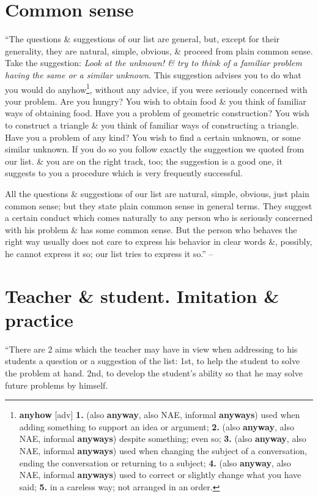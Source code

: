 \documentclass[oneside]{book}
\numberwithin{equation}{section}
\begin{document}
\section{Common sense}
``The questions \& suggestions of our list are general, but, except for their generality, they are natural, simple, obvious, \& proceed from plain common sense. Take the suggestion: \textit{Look at the unknown! \& try to think of a familiar problem having the same or a similar unknown}. This suggestion advises you to do what you would do anyhow\footnote{\textbf{anyhow} [adv] \textbf{1.} (also \textbf{anyway}, also NAE, informal \textbf{anyways}) used when adding something to support an idea or argument; \textbf{2.} (also \textbf{anyway}, also NAE, informal \textbf{anyways}) despite something; even so; \textbf{3.} (also \textbf{anyway}, also NAE, informal \textbf{anyways}) used when changing the subject of a conversation, ending the conversation or returning to a subject; \textbf{4.} (also \textbf{anyway}, also NAE, informal \textbf{anyways}) used to correct or slightly change what you have said; \textbf{5.} in a careless way; not arranged in an order.}, without any advice, if you were seriously concerned with your problem. Are you hungry? You wish to obtain food \& you think of familiar ways of obtaining food. Have you a problem of geometric construction? You wish to construct a triangle \& you think of familiar ways of constructing a triangle. Have you a problem of any kind? You wish to find a certain unknown, or some similar unknown. If you do so you follow exactly the suggestion we quoted from our list. \& you are on the right track, too; the suggestion is a good one, it suggests to you a procedure which is very frequently successful.

All the questions \& suggestions of our list are natural, simple, obvious, just plain common sense; but they state plain common sense in general terms. They suggest a certain conduct which comes naturally to any person who is seriously concerned with his problem \& has some common sense. But the person who behaves the right way usually does not care to express his behavior in clear words \&, possibly, he cannot express it so; our list tries to express it so.'' -- \cite[p. 3]{Polya2014}

\section{Teacher \& student. Imitation \& practice}
``There are 2 aims which the teacher may have in view when addressing to his students a question or a suggestion of the list: 1st, to help the student to solve the problem at hand. 2nd, to develop the student's ability so that he may solve future problems by himself.
\end{document}
